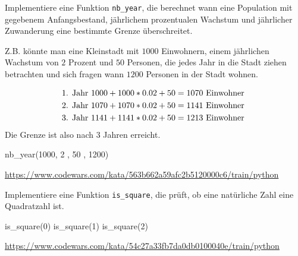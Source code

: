 \documentclass[class=scrartcl, crop=false]{standalone}
\begin{document}
\begin{aufgabe} \noindent
Implementiere eine Funktion \texttt{nb_year}, die berechnet wann eine Population mit gegebenem Anfangsbestand, jährlichem prozentualen Wachstum und jährlicher Zuwanderung eine bestimmte Grenze überschreitet.

Z.B. könnte man eine Kleinstadt mit $1000$ Einwohnern, einem jährlichen Wachstum von $2$ Prozent und $50 $ Personen, die jedes Jahr in die Stadt ziehen betrachten und sich fragen wann $1200$ Personen in der Stadt wohnen.

\begin{align*}
\textnormal{1. Jahr } & 1000 + 1000 * 0.02 + 50 = 1070 \textnormal{ Einwohner } \\
\textnormal{2. Jahr } & 1070 + 1070 * 0.02 + 50 = 1141 \textnormal{ Einwohner } \\
\textnormal{3. Jahr } & 1141 + 1141 * 0.02 + 50 = 1213  \textnormal{ Einwohner }
\end{align*}
Die Grenze ist also nach $3$ Jahren erreicht.\\ 

\begin{pyconsole}
nb_year(1000, 2 , 50 , 1200)
\end{pyconsole}

\noindent\url{https://www.codewars.com/kata/563b662a59afc2b5120000c6/train/python}

\end{aufgabe}





\begin{aufgabe} \noindent
Implementiere eine Funktion \texttt{is_square}, die prüft, ob eine natürliche Zahl eine Quadratzahl ist.

\begin{pyconsole}
is_square(0)
is_square(1)
is_square(2)
\end{pyconsole}

\noindent\url{https://www.codewars.com/kata/54c27a33fb7da0db0100040e/train/python}

\end{aufgabe}
\end{document}
